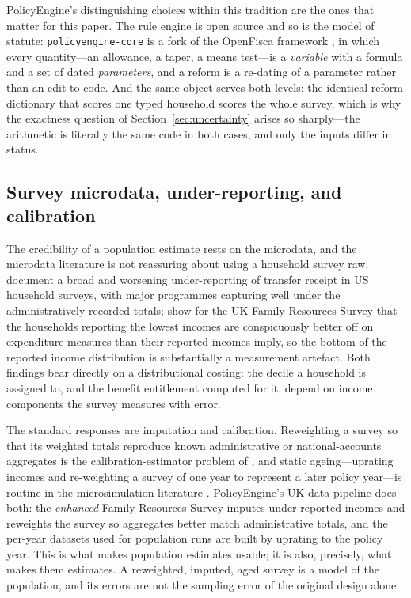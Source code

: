 PolicyEngine's distinguishing choices within this tradition are the ones that matter for this paper. The rule engine is open source and so is the model of statute: \texttt{policyengine-core} is a fork of the OpenFisca framework \citep{openfisca}, in which every quantity---an allowance, a taper, a means test---is a \emph{variable} with a formula and a set of dated \emph{parameters}, and a reform is a re-dating of a parameter rather than an edit to code. And the same object serves both levels: the identical reform dictionary that scores one typed household scores the whole survey, which is why the exactness question of Section~\ref{sec:uncertainty} arises so sharply---the arithmetic is literally the same code in both cases, and only the inputs differ in status.

\subsection{Survey microdata, under-reporting, and calibration}

The credibility of a population estimate rests on the microdata, and the microdata literature is not reassuring about using a household survey raw. \citet{meyer2015} document a broad and worsening under-reporting of transfer receipt in US household surveys, with major programmes capturing well under the administratively recorded totals; \citet{brewer2017} show for the UK Family Resources Survey that the households reporting the lowest incomes are conspicuously better off on expenditure measures than their reported incomes imply, so the bottom of the reported income distribution is substantially a measurement artefact. Both findings bear directly on a distributional costing: the decile a household is assigned to, and the benefit entitlement computed for it, depend on income components the survey measures with error.

The standard responses are imputation and calibration. Reweighting a survey so that its weighted totals reproduce known administrative or national-accounts aggregates is the calibration-estimator problem of \citet{deville1992}, and static ageing---uprating incomes and re-weighting a survey of one year to represent a later policy year---is routine in the microsimulation literature \citep{figari2015}. PolicyEngine's UK data pipeline does both: the \emph{enhanced} Family Resources Survey \citep{dwpfrs} imputes under-reported incomes and reweights the survey so aggregates better match administrative totals, and the per-year datasets used for population runs are built by uprating to the policy year. This is what makes population estimates usable; it is also, precisely, what makes them estimates. A reweighted, imputed, aged survey is a model of the population, and its errors are not the sampling error of the original design alone.

